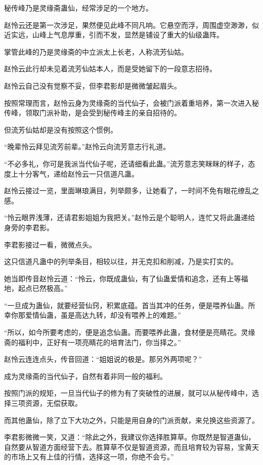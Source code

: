 \begin{this_body}
秘传峰乃是灵缘斋蛊仙，经常涉足的一个地方。

赵怜云还是第一次涉足，果然便见此峰不同凡响。它悬空而浮，周围虚空渺渺，似近实远，山峰上气息厚重，引而不发，显然是铺设了重大的仙级蛊阵。

掌管此峰的乃是灵缘斋的中立派太上长老，人称流芳仙姑。

赵怜云此行却未见着流芳仙姑本人，而是受她留下的一段意志招待。

赵怜云自己没有觉察不妥，但李君影却是微微皱起眉头。

按照常理而言，赵怜云身为灵缘斋的当代仙子，会被门派着重培养，第一次进入秘传峰，领取门派补助，是会受到秘传峰主的亲自招待的。

但流芳仙姑却是没有按照这个惯例。

“晚辈怜云拜见流芳前辈。”赵怜云向流芳意志行礼道。

“不必多礼，你可是我派当代仙子呢，还请细看此蛊。”流芳意志笑眯眯的样子，态度上十分客气，递给赵怜云一只信道凡蛊。

赵怜云接过一览，里面琳琅满目，列举颇多，让她看了，一时间不免有眼花缭乱之感。

“怜云眼界浅薄，还请君影姐姐为我把关。”赵怜云是个聪明人，连忙又将此蛊递给身旁的李君影。

李君影接过一看，微微点头。

这只信道凡蛊中的列举条目，相较以往，并无克扣和削减，乃是实打实的。

她当即传音赵怜云道：“怜云，你既成蛊仙，有了仙蛊爱情和追念，还有上等福地，起点已然极高。”

“一旦成为蛊仙，就要经营仙窍，积累底蕴。首当其冲的任务，便是喂养仙蛊。所幸你那爱情仙蛊，虽是高达九转，却没有喂养上的难题。”

“所以，如今所要考虑的，便是追念仙蛊。而要喂养此蛊，食材便是亮睛花。灵缘斋的福利中，正好有一项亮睛花的培育法门，你当择之。”

赵怜云连连点头，传音回道：“姐姐说的极是。那另外两项呢？”

成为灵缘斋的当代仙子，自然有着非同一般的福利。

按照门派的规矩，一旦当代仙子的修为有了突破性的进展，就可以从秘传峰中，选择三项资源，无偿获取。

而其他蛊仙，除了立下大功之外，只能是用自身的门派贡献，来兑换这些资源了。

李君影微微一笑，又道：“除此之外，我建议你选择胜算草。你既然是智道蛊仙，自然要从智道方面经营下去。胜算草不仅是智道资源，而且培育较为容易，宝黄天的市场上又有上佳的行情，选择这一项，你绝不会亏。”


\end{this_body}
